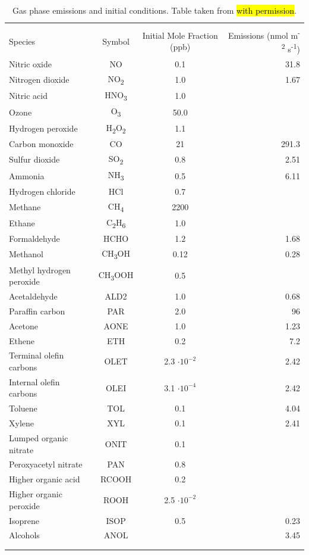 \begin{table}[h]
\centering
\caption{Gas phase emissions and initial conditions. Table taken from \cite{riemer_simulating_2009} \hl{with permission}.}
\begin{tabular*}{\linewidth}{@{\extracolsep{\fill}} lccr}
\\[-2ex]\hline 
     \hline \\[-2ex] Species & Symbol & Initial Mole Fraction (ppb) & Emissions (nmol m\textsuperscript{-2} s\textsuperscript{-1}) \\
\midrule
Nitric oxide & NO & 0.1 & 31.8 \\
Nitrogen dioxide & NO\textsubscript{2} & 1.0 & 1.67 \\
Nitric acid & HNO\textsubscript{3} & 1.0 & \\
Ozone & O\textsubscript{3} & 50.0 & \\
Hydrogen peroxide & H\textsubscript{2}O\textsubscript{2} & 1.1 & \\
Carbon monoxide & CO & 21 & 291.3 \\
Sulfur dioxide & SO\textsubscript{2} & 0.8 & 2.51 \\
Ammonia & NH\textsubscript{3} & 0.5 & 6.11 \\
Hydrogen chloride & HCl & 0.7 & \\
Methane & CH\textsubscript{4} & 2200 & \\
Ethane & C\textsubscript{2}H\textsubscript{6} & 1.0 & \\
Formaldehyde & HCHO & 1.2 & 1.68 \\
Methanol & CH\textsubscript{3}OH & 0.12 & 0.28 \\
Methyl hydrogen peroxide & CH\textsubscript{3}OOH & 0.5 & \\
Acetaldehyde & ALD2 & 1.0 & 0.68 \\
Paraffin carbon & PAR & 2.0 & 96 \\
Acetone & AONE & 1.0 & 1.23 \\
Ethene & ETH & 0.2 & 7.2 \\
Terminal olefin carbons & OLET & 2.3 \(\cdot 10^{-2}\) & 2.42 \\
Internal olefin carbons & OLEI & 3.1 \(\cdot 10^{-4}\) & 2.42 \\
Toluene & TOL & 0.1 & 4.04 \\
Xylene & XYL & 0.1 & 2.41 \\
Lumped organic nitrate & ONIT & 0.1 & \\
Peroxyacetyl nitrate & PAN & 0.8 & \\
Higher organic acid & RCOOH & 0.2 & \\
Higher organic peroxide & ROOH & 2.5 \(\cdot 10^{-2}\) & \\
Isoprene & ISOP & 0.5 & 0.23 \\
Alcohols & ANOL & & 3.45 \\
\\[-2ex]\hline 
     \hline \\[-2ex]
\end{tabular*}
\label{table:gas_emiss_ics}
\end{table}

